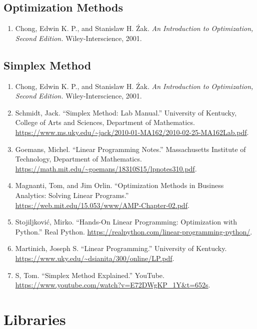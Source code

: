 \documentclass[11pt]{article}
\providecommand{\tightlist}{%
      \setlength{\itemsep}{0pt}\setlength{\parskip}{0pt}}
\begin{document}
\subsection{Optimization Methods}\label{optimization-methods}

\begin{enumerate}
\def\labelenumi{\arabic{enumi}.}
\setcounter{enumi}{7}
\tightlist
\item
  Chong, Edwin K. P., and Stanislaw H. Źak. \emph{An Introduction to
  Optimization, Second Edition.} Wiley-Interscience, 2001.
\end{enumerate}

\subsection{Simplex Method}\label{simplex-method}

\begin{enumerate}
\def\labelenumi{\arabic{enumi}.}
\setcounter{enumi}{7}
\item
  Chong, Edwin K. P., and Stanislaw H. Źak. \emph{An Introduction to
  Optimization, Second Edition.} Wiley-Interscience, 2001.
\item
  Schmidt, Jack. ``Simplex Method: Lab Manual.'' University of Kentucky,
  College of Arts and Sciences, Department of Mathematics.
  \url{https://www.ms.uky.edu/~jack/2010-01-MA162/2010-02-25-MA162Lab.pdf}.
\item
  Goemans, Michel. ``Linear Programming Notes.'' Massachusetts Institute
  of Technology, Department of Mathematics.
  \url{https://math.mit.edu/~goemans/18310S15/lpnotes310.pdf}.
\item
  Magnanti, Tom, and Jim Orlin. ``Optimization Methods in Business
  Analytics: Solving Linear Programs.''
  \url{https://web.mit.edu/15.053/www/AMP-Chapter-02.pdf}.
\item
  Stojiljković, Mirko. ``Hands-On Linear Programming: Optimization with
  Python.'' Real Python.
  \url{https://realpython.com/linear-programming-python/}.
\item
  Martinich, Joseph S. ``Linear Programming.'' University of Kentucky.
  \url{https://www.uky.edu/~dsianita/300/online/LP.pdf}.
\item
  S, Tom. ``Simplex Method Explained.'' YouTube.
  \url{https://www.youtube.com/watch?v=E72DWgKP_1Y&t=652s}.
\end{enumerate}

    \section{Libraries}\label{libraries}
\end{document}
